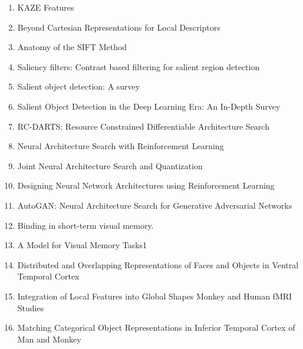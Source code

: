\documentclass[acmlarge]{acmart}
\begin{document}
\begin{enumerate}
	\item KAZE Features \cite{Alcantarilla2012KAZEF} 

	\item Beyond Cartesian Representations for Local Descriptors \cite{Ebel2019BeyondCR} 

	\item Anatomy of the SIFT Method \cite{ReyOtero2014AnatomyOT} 

	\item Saliency filters: Contrast based filtering for salient region detection \cite{Perazzi2012SaliencyFC} 

	\item Salient object detection: A survey \cite{Borji2019SalientOD} 

	\item Salient Object Detection in the Deep Learning Era: An In-Depth Survey \cite{Wang2019SalientOD} 

	\item RC-DARTS: Resource Constrained Differentiable Architecture Search \cite{Jin2019RCDARTSRC} 

	\item Neural Architecture Search with Reinforcement Learning \cite{Zoph2017NeuralAS} 

	\item Joint Neural Architecture Search and Quantization \cite{Chen2018JointNA} 

	\item Designing Neural Network Architectures using Reinforcement Learning \cite{Baker2017DesigningNN} 

	\item AutoGAN: Neural Architecture Search for Generative Adversarial Networks \cite{Gong2019AutoGANNA} 

	\item Binding in short-term visual memory. \cite{Wheeler2002BindingIS} 

	\item A Model for Visual Memory Tasks1 \cite{Sperling1963AMF} 

	\item Distributed and Overlapping Representations of Faces and Objects in Ventral Temporal Cortex \cite{Haxby2001DistributedAO} 

	\item Integration of Local Features into Global Shapes Monkey and Human fMRI Studies \cite{Kourtzi2003IntegrationOL} 

	\item Matching Categorical Object Representations in Inferior Temporal Cortex of Man and Monkey \cite{Kriegeskorte2008MatchingCO} 


\end{enumerate}
\end{document}
